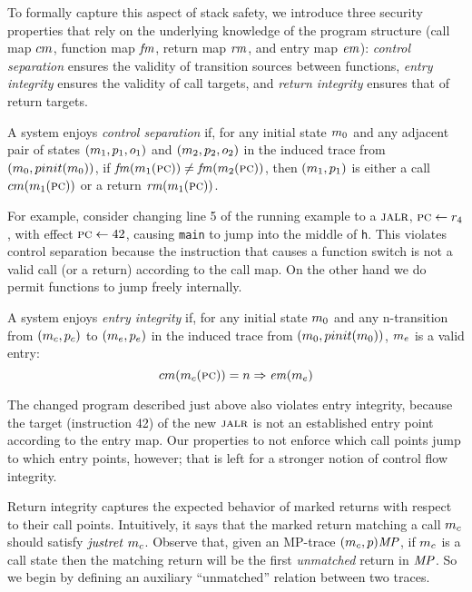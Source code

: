 \documentclass[acmsmall,review,anonymous]{acmart}\settopmatter{printfolios=true,printccs=false,printacmref=false}
\begin{document}
To formally capture this aspect of stack safety, we introduce three
security properties that rely on the underlying knowledge of the
program structure (call map $cm$, function map $\mathit{fm}$, return map $\mathit{rm}$, and entry
map $\mathit{em}$): {\em control separation} ensures the validity of transition
sources between functions, {\em entry integrity} ensures the validity
of call targets, and {\em return integrity} ensures that of
return targets.

A system enjoys {\em control separation}
if, for any initial state \(m_0\) and any adjacent pair of states
\((m_1,p_1,o_1)\) and \((m_2,p_2,o_2)\)
in the induced trace from \((m_0,pinit(m_0))\),
if \(\mathit{fm}(m_1(\textsc{pc})) \not = \mathit{fm}(m_2(\textsc{pc}))\),
then \((m_1,p_1)\) is either a call \(cm(m_1(\textsc{pc}))\)
or a return \(\mathit{rm}(m_1(\textsc{pc}))\).

\smallskip

For example, consider changing line 5 of the running example to a $\textsc{jalr}$,
$\textsc{pc} \leftarrow r_4$, with effect $\textsc{pc} \leftarrow 42$, causing {\tt main}
to jump into the middle of {\tt h}.
This violates control separation because the instruction that causes a
function switch is not a valid call (or a return) according to the
call map. On the other hand we do permit functions to jump freely internally.

A system enjoys {\em entry integrity}
if, for any initial state \(m_0\)
and any n-transition from \((m_c,p_c)\) to
\((m_e, p_e)\) in the induced trace from
\((m_0,pinit(m_0))\), $m_e$ is a valid entry:
\[cm(m_c(\textsc{pc})) = n \Rightarrow \mathit{em}(m_e)\]

The changed program described just above also violates entry integrity,
because the target (instruction 42) of the new $\textsc{jalr}$ is not an established
entry point according to the entry map. Our properties to not enforce which
call points jump to which entry points, however; that is left for a stronger
notion of control flow integrity.

\newcommand*{\Unmatched}{\mathit{um}}

Return integrity captures the expected behavior of marked returns with
respect to their call points. Intuitively, it says that the marked return
matching a call $m_c$ should satisfy $\mathit{justret}\ m_c$.
Observe that, given an MP-trace $(m_c,p)\mathit{MP}$, if $m_c$ is
a call state then the matching return will be the first \emph{unmatched} return
in $\mathit{MP}$. So we begin by defining an auxiliary ``unmatched'' relation between
two traces.
\end{document}
